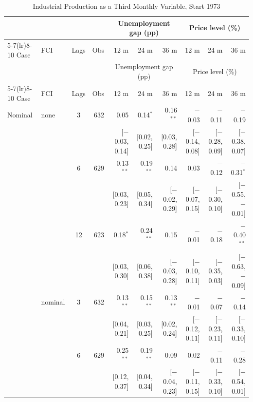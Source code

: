 \begingroup\scriptsize\setlength{\tabcolsep}{0.9pt}
\begin{longtable}{llcrrrrrrr}
\caption{Industrial Production as a Third Monthly Variable, Start 1973}\label{tab:appR773}\\
\toprule
 & & & & \multicolumn{3}{c}{Unemployment gap (pp)} & \multicolumn{3}{c}{Price level (\%)}\\ \cmidrule(lr){5-7}\cmidrule(lr){8-10}
Case & FCI & Lags & Obs & 12 m & 24 m & 36 m & 12 m & 24 m & 36 m\\
\midrule\endfirsthead
\toprule
 & & & & \multicolumn{3}{c}{Unemployment gap (pp)} & \multicolumn{3}{c}{Price level (\%)}\\ \cmidrule(lr){5-7}\cmidrule(lr){8-10}
Case & FCI & Lags & Obs & 12 m & 24 m & 36 m & 12 m & 24 m & 36 m\\
\midrule\endhead
\bottomrule\endfoot
Nominal & none & 3 & 632 & 0.05 & 0.14$^{*}$ & 0.16$^{**}$ & $-$0.03 & $-$0.11 & $-$0.19\\
 & & & & {\scriptsize [$-$0.03, 0.14]} & {\scriptsize [0.02, 0.25]} & {\scriptsize [0.03, 0.28]} & {\scriptsize [$-$0.14, 0.08]} & {\scriptsize [$-$0.28, 0.09]} & {\scriptsize [$-$0.38, 0.07]}\\
 &  & 6 & 629 & 0.13$^{**}$ & 0.19$^{**}$ & 0.14 & 0.03 & $-$0.12 & $-$0.31$^{*}$\\
 & & & & {\scriptsize [0.03, 0.23]} & {\scriptsize [0.05, 0.34]} & {\scriptsize [$-$0.02, 0.29]} & {\scriptsize [$-$0.07, 0.15]} & {\scriptsize [$-$0.30, 0.10]} & {\scriptsize [$-$0.55, $-$0.01]}\\
 &  & 12 & 623 & 0.18$^{*}$ & 0.24$^{**}$ & 0.15 & $-$0.01 & $-$0.18 & $-$0.40$^{**}$\\
 & & & & {\scriptsize [0.03, 0.30]} & {\scriptsize [0.06, 0.38]} & {\scriptsize [$-$0.03, 0.28]} & {\scriptsize [$-$0.10, 0.11]} & {\scriptsize [$-$0.35, 0.03]} & {\scriptsize [$-$0.63, $-$0.09]}\\
 & nominal & 3 & 632 & 0.13$^{**}$ & 0.15$^{**}$ & 0.13$^{**}$ & $-$0.01 & $-$0.07 & $-$0.14\\
 & & & & {\scriptsize [0.04, 0.21]} & {\scriptsize [0.03, 0.25]} & {\scriptsize [0.02, 0.24]} & {\scriptsize [$-$0.12, 0.11]} & {\scriptsize [$-$0.23, 0.11]} & {\scriptsize [$-$0.33, 0.10]}\\
 &  & 6 & 629 & 0.25$^{**}$ & 0.19$^{**}$ & 0.09 & 0.02 & $-$0.11 & $-$0.28\\
 & & & & {\scriptsize [0.12, 0.37]} & {\scriptsize [0.04, 0.34]} & {\scriptsize [$-$0.04, 0.23]} & {\scriptsize [$-$0.11, 0.15]} & {\scriptsize [$-$0.33, 0.10]} & {\scriptsize [$-$0.54, 0.01]}\\

\end{longtable}
